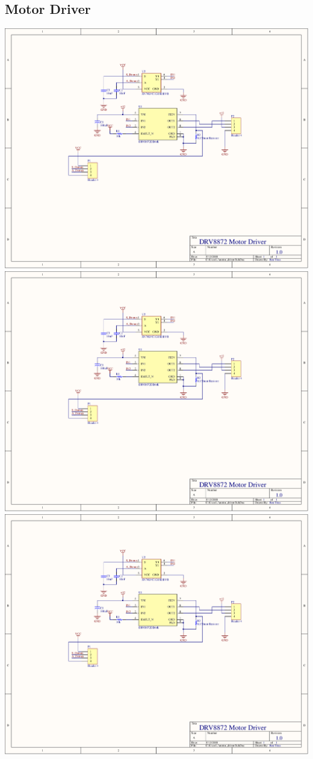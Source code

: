 \begin{flushleft}
\section{Motor Driver}
\end{flushleft}
\label{app:motor_driver}
\centering
\includegraphics[page=1,width=\textwidth,angle=270]{PDFs/motor_driver.PDF} \newpage
\includegraphics[page=2,width=\textwidth,angle=270]{PDFs/motor_driver.PDF} \newpage 
\includegraphics[page=3,width=\textwidth,angle=270]{PDFs/motor_driver.PDF} \newpage